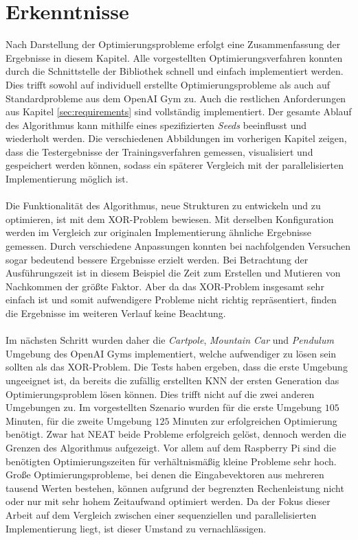 \section{Erkenntnisse}
\label{sec:analysis_results}
Nach Darstellung der Optimierungsprobleme erfolgt eine Zusammenfassung der Ergebnisse in diesem Kapitel. Alle vorgestellten Optimierungsverfahren konnten durch die Schnittstelle der Bibliothek schnell und einfach implementiert werden. Dies trifft sowohl auf individuell erstellte Optimierungsprobleme als auch auf Standardprobleme aus dem OpenAI Gym zu. Auch die restlichen Anforderungen aus Kapitel \ref{sec:requirements} sind vollständig implementiert. Der gesamte Ablauf des Algorithmus kann mithilfe eines spezifizierten \emph{Seeds} beeinflusst und wiederholt werden. Die verschiedenen Abbildungen im vorherigen Kapitel zeigen, dass die Testergebnisse der Trainingsverfahren gemessen, visualisiert und gespeichert werden können, sodass ein späterer Vergleich mit der parallelisierten Implementierung möglich ist.
\\\\
Die Funktionalität des Algorithmus, neue Strukturen zu entwickeln und zu optimieren, ist mit dem XOR-Problem bewiesen. Mit derselben Konfiguration werden im Vergleich zur originalen Implementierung ähnliche Ergebnisse gemessen. Durch verschiedene Anpassungen konnten bei nachfolgenden Versuchen sogar bedeutend bessere Ergebnisse erzielt werden. Bei Betrachtung der Ausführungszeit ist in diesem Beispiel die Zeit zum Erstellen und Mutieren von Nachkommen der größte Faktor. Aber da das XOR-Problem insgesamt sehr einfach ist und somit aufwendigere Probleme nicht richtig repräsentiert, finden die Ergebnisse im weiteren Verlauf keine Beachtung.
\\\\
Im nächsten Schritt wurden daher die \emph{Cartpole}, \emph{Mountain Car} und \emph{Pendulum} Umgebung des OpenAI Gyms implementiert, welche aufwendiger zu lösen sein sollten als das XOR-Problem. Die Tests haben ergeben, dass die erste Umgebung ungeeignet ist, da bereits die zufällig erstellten \ac{KNN} der ersten Generation das Optimierungsproblem lösen können. Dies trifft nicht auf die zwei anderen Umgebungen zu. Im vorgestellten Szenario wurden für die erste Umgebung $105$ Minuten, für die zweite Umgebung $125$ Minuten zur erfolgreichen Optimierung benötigt. Zwar hat \ac{NEAT} beide Probleme erfolgreich gelöst, dennoch werden die Grenzen des Algorithmus aufgezeigt. Vor allem auf dem Raspberry Pi sind die benötigten Optimierungszeiten für verhältnismäßig kleine Probleme sehr hoch. Große Optimierungsprobleme, bei denen die Eingabevektoren aus mehreren tausend Werten bestehen, können aufgrund der begrenzten Rechenleistung nicht oder nur mit sehr hohem Zeitaufwand optimiert werden. Da der Fokus dieser Arbeit auf dem Vergleich zwischen einer sequenziellen und parallelisierten Implementierung liegt, ist dieser Umstand zu vernachlässigen.
